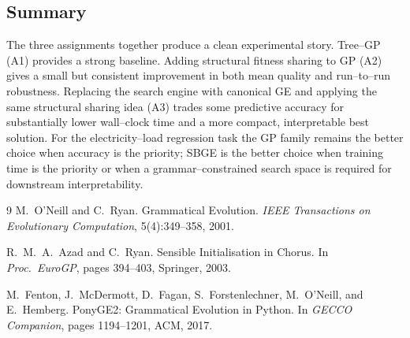 \documentclass[12pt,a4paper]{article}
\begin{document}
\subsection{Summary}
The three assignments together produce a clean experimental story.
Tree--GP (A1) provides a strong baseline. Adding structural fitness
sharing to GP (A2) gives a small but consistent improvement in both
mean quality and run--to--run robustness. Replacing the search engine
with canonical GE and applying the same structural sharing idea (A3)
trades some predictive accuracy for substantially lower wall--clock
time and a more compact, interpretable best solution. For the
electricity--load regression task the GP family remains the better
choice when accuracy is the priority; SBGE is the better choice when
training time is the priority or when a grammar--constrained search
space is required for downstream interpretability.

\begin{thebibliography}{9}
M.~O'Neill and C.~Ryan.
\newblock Grammatical Evolution.
\newblock \emph{IEEE Transactions on Evolutionary Computation}, 5(4):349--358, 2001.

R.~M.~A.~Azad and C.~Ryan.
\newblock Sensible Initialisation in Chorus.
\newblock In \emph{Proc.\ EuroGP}, pages 394--403, Springer, 2003.

M.~Fenton, J.~McDermott, D.~Fagan, S.~Forstenlechner, M.~O'Neill, and
E.~Hemberg.
\newblock PonyGE2: Grammatical Evolution in Python.
\newblock In \emph{GECCO Companion}, pages 1194--1201, ACM, 2017.
\end{thebibliography}
\end{document}
